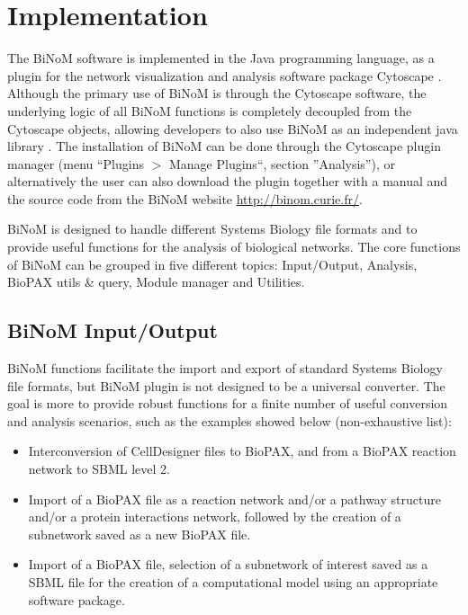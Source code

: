 \documentclass[10pt]{bmc_article}
\newenvironment{bmcformat}{\baselineskip20pt\sloppy\setboolean{publ}{false}}{\baselineskip20pt\sloppy}
\begin{document}
\begin{bmcformat}
\section*{Implementation}
The BiNoM software is implemented in the Java programming language, as a plugin
for the network visualization and analysis software package Cytoscape
\cite{cline2007integration}. Although the primary use of BiNoM is through the
Cytoscape software, the underlying logic of all BiNoM functions is completely
decoupled from the Cytoscape objects, allowing developers to also use BiNoM as
an independent java library \cite{zinovyev2008binom}. The installation of BiNoM
can be done through the Cytoscape plugin manager (menu ``Plugins $>$ Manage
Plugins``, section ''Analysis''), or alternatively the user can
also download the plugin together with a manual and the source code from the
BiNoM website
\url{http://binom.curie.fr/}. 


BiNoM is designed to handle different Systems Biology file formats and to
provide useful functions for the analysis of biological networks. The core
functions of BiNoM can be grouped in five different topics: Input/Output,
Analysis, BioPAX utils \& query, Module manager and Utilities.

\subsection*{BiNoM Input/Output}

BiNoM functions facilitate the import and export of standard Systems Biology
file formats, but BiNoM plugin is not designed to be a universal converter.
The goal is more
to provide robust functions for a finite number of useful conversion and
analysis scenarios, such as the examples showed below (non-exhaustive list):

\begin{itemize}

\item Interconversion of CellDesigner files to BioPAX, and from a BioPAX
reaction network to SBML level 2.

\item Import of a BioPAX file as a reaction network and/or a pathway structure
and/or a protein interactions network, followed by the creation of a subnetwork
saved as a new BioPAX file.

\item Import of a BioPAX file, selection of a subnetwork of interest saved as a SBML file for
the creation of a computational model using an appropriate software package.


\end{itemize}
\end{bmcformat}
\end{document}
